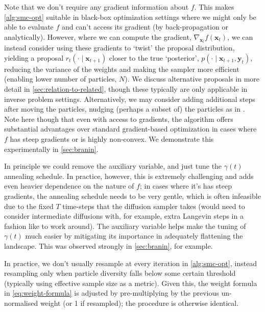 \begin{remark} \label{rem:grad-free}
    Note that we don't require any gradient information about $f$. This makes \autoref{alg:smc-opt}
    suitable in black-box optimization settings where we might only be able to evaluate $f$ and
    can't access its gradient (by back-propagation or analytically). However, where we can compute
    the gradient, $\nabla_{\mathbf{x}_{t}} f(\mathbf{x}_{t})$, we can instead consider using
    these gradients to `twist' \parencite{wuPracticalAsymptoticallyExact2023} the proposal
    distribution, yielding a proposal $r_t(\cdot \mid \mathbf{x}_{t+1})$ closer to the true
    `posterior', $p(\cdot \mid \mathbf{x}_{t+1}, \mathbf{y}_t)$, reducing the variance of the
    weights and making the sampler more efficient (enabling lower number of particles, $N$).
    We discuss alternative proposals in more detail in \autoref{sec:relation-to-related}, though
    these typically are only applicable in inverse problem settings.
    Alternatively, we may consider adding additional steps after moving the particles, nudging
    (perhaps a subset of) the particles as in \textcite{akyildizNudgingParticleFilter2020}.
    Note here though that even with access to gradients, the algorithm offers substantial
    advantages over standard gradient-based optimization in cases where $f$ has steep gradients
    or is highly non-convex. We demonstrate this experimentally in \autoref{sec:branin}.
\end{remark}

\begin{remark}
    In principle we could remove the auxiliary variable, and just tune the $\gamma(t)$
    annealing schedule. In practice, however, this is extremely challenging and adds even heavier
    dependence on the nature of $f$; in cases where it's has steep gradients, the annealing schedule
    needs to be very gentle, which is often infeasible due to the fixed $T$ time-steps that the
    diffusion sampler takes (would need to consider intermediate diffusions with, for example, extra
    Langevin steps in a fashion like \textcite{janatiDivideandConquerPosteriorSampling2024} to work
    around). The auxiliary variable helps make the tuning of $\gamma(t)$ much easier by mitigating
    its importance in adequately flattening the landscape. This was observed strongly in
    \autoref{sec:branin}, for example.
\end{remark}

\begin{remark}
    In practice, we don't usually resample at every iteration in \autoref{alg:smc-opt}, instead
    resampling only when particle diversity falls below some certain threshold (typically using
    effective sample size as a metric). Given this, the weight formula in \autoref{eq:weight-formula} is
    adjusted by pre-multiplying by the previous un-normalised weight (or 1 if resampled); the
    procedure is otherwise identical.
\end{remark}

